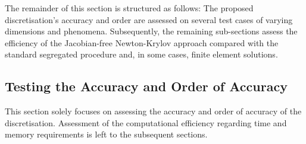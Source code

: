 \documentclass[sn-mathphys,Numbered]{sn-jnl}%
\begin{document}
The remainder of this section is structured as follows:
The proposed discretisation's accuracy and order are assessed on several test cases of varying dimensions and phenomena.
Subsequently, the remaining sub-sections assess the efficiency of the Jacobian-free Newton-Krylov approach compared with the standard segregated procedure and, in some cases, finite element solutions.


\subsection{Testing the Accuracy and Order of Accuracy}
\label{sec:accuracy}
This section solely focuses on assessing the accuracy and order of accuracy of the discretisation.
Assessment of the computational efficiency regarding time and memory requirements is left to the subsequent sections.


 
\end{document}
